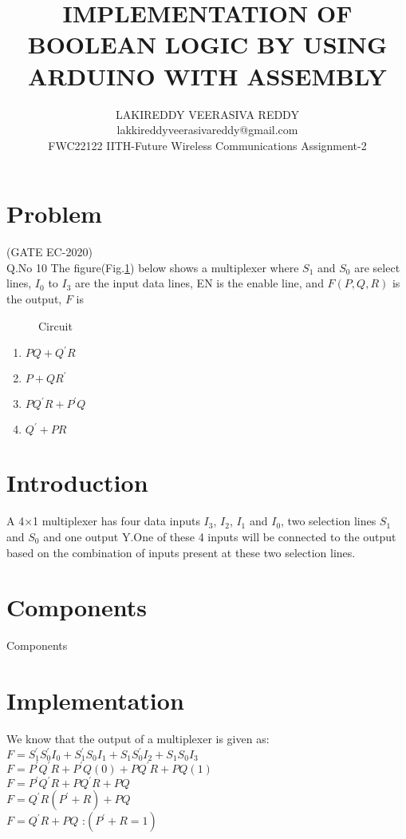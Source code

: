 \documentclass{article}
\title{IMPLEMENTATION OF BOOLEAN LOGIC BY USING ARDUINO WITH ASSEMBLY}
\author{LAKIREDDY VEERASIVA REDDY\\lakkireddyveerasivareddy@gmail.com\\FWC22122 IITH-Future Wireless Communications Assignment-2}
\begin{document}
\maketitle
\tableofcontents
\pagebreak

\section{Problem}                               
(GATE EC-2020)\\                                  
Q.No 10    The figure(Fig.\ref{fig:Circuit}) below shows a multiplexer where $S_1$ and $S_0$ are select lines, $I_0$ to $I_3$ are the input data lines, EN is the enable line, and $F(P,Q,R)$ is the output, $F$ is
\begin{figure}[!h]
\begin{center}

\end{center}
\caption{Circuit}
\label{fig:Circuit}
\end{figure}

\begin{enumerate}
   \item $PQ +{Q^\prime} R$
   \item $P+Q {R^\prime}$
   \item $P{Q^\prime} R+{P^\prime}Q$
   \item ${Q^\prime} +PR$
\end{enumerate}

\section{Introduction}
A 4×1 multiplexer has four data inputs $I_3$, $I_2$, $I_1$ and $I_0$, two selection lines $S_1$ and $S_0$ and one output Y.One of these 4 inputs will be connected to the output based on the combination of inputs present at these two selection lines. 

\section{Components}
\begin{table}[!h]
\centering

\caption{Components}
\label{table:Components}
\end{table}

\section{Implementation}
We know that the output of a multiplexer is given as: \\
$F=S_1^\prime S_0^\prime I_0+S_1^\prime S_0I_1+S_1S_0^\prime I_2+S_1S_0I_3$ \\ 
$F=P^\prime Q^\prime R+P^\prime Q(0)+PQ^\prime R+PQ(1)$ \\
$F=P^\prime Q^\prime R+PQ^\prime R+PQ$ \\
$F=Q^\prime R(P^\prime +R) +PQ$ \\
$F=Q^\prime R+PQ$     :$(P^\prime +R=1)$
\end{document}
